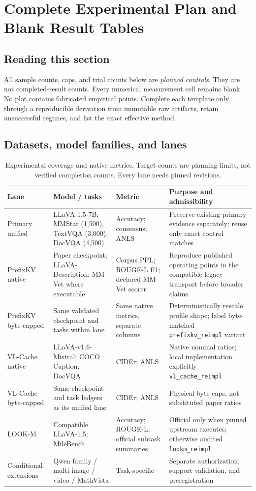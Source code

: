 \section{Complete Experimental Plan and Blank Result Tables}
\label{app:experiments}
\subsection{Reading this section}
All sample counts, caps, and trial counts below are \emph{planned controls}.
They are not completed-result counts. Every numerical measurement cell remains
blank. No plot contains fabricated empirical points. Complete each template
only through a reproducible derivation from immutable raw artifacts, retain
unsuccessful regimes, and list the exact effective method.

\subsection{Datasets, model families, and lanes}
\begin{table}[t]
\caption{Experimental coverage and native metrics. Target counts are planning
limits, not verified completion counts. Every lane needs pinned revisions.}
\small\begin{tabularx}{\textwidth}{P{2.2cm}P{3cm}P{2.3cm}Y}\toprule
Lane & Model / tasks & Metric & Purpose and admissibility\\\midrule
Primary unified & LLaVA-1.5-7B; MMStar (1,500), TextVQA (3,000), DocVQA (4,500) & Accuracy; consensus; ANLS & Preserve existing primary evidence separately; reuse only exact control matches\\
PrefixKV native & Paper checkpoint; LLaVA-Description; MM-Vet where executable & Corpus PPL; ROUGE-L F1; declared MM-Vet scorer & Reproduce published operating points in the compatible legacy transport before broader claims\\
PrefixKV byte-capped & Same validated checkpoint and tasks within lane & Same native metrics, separate columns & Deterministically rescale profile shape; label byte-matched \texttt{prefixkv\_reimpl} variant\\
VL-Cache native & LLaVA-v1.6-Mistral; COCO Caption; DocVQA & CIDEr; ANLS & Native nominal ratios; local implementation explicitly \texttt{vl\_cache\_reimpl}\\
VL-Cache byte-capped & Same checkpoint and task ledgers as its unified lane & CIDEr; ANLS & Physical-byte caps, not substituted paper ratios\\
LOOK-M & Compatible LLaVA-1.5; MileBench & Accuracy; ROUGE-L; official subtask summaries & Official only when pinned upstream executes; otherwise audited \texttt{lookm\_reimpl}\\
Conditional extensions & Qwen family / multi-image / video / MathVista & Task-specific & Separate authorization, support validation, and preregistration\\
\bottomrule\end{tabularx}
\end{table}

